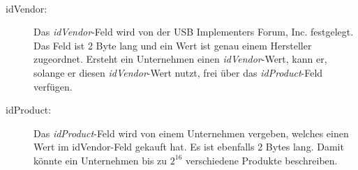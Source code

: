 $ $\\\\
\begin{description}
	\item[idVendor: ] Das \textit{idVendor}-Feld wird von der USB Implementers Forum, Inc. festgelegt. Das Feld ist 2 Byte lang und ein Wert ist genau einem Hersteller zugeordnet. Ersteht ein Unternehmen einen \textit{idVendor}-Wert, kann er, solange er diesen \textit{idVendor}-Wert nutzt, frei über das \textit{idProduct}-Feld verfügen.
	\item[idProduct: ] Das \textit{idProduct}-Feld wird von einem Unternehmen vergeben, welches einen Wert im idVendor-Feld gekauft hat. Es ist ebenfalls 2 Bytes lang. Damit könnte ein Unternehmen bis zu $2^{16}$ verschiedene Produkte beschreiben.
	
\end{description}